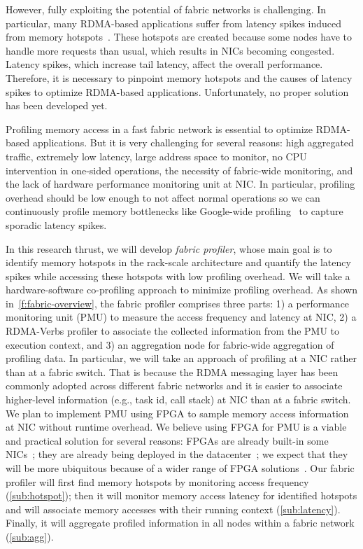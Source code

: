 However, fully exploiting the potential of fabric
networks is challenging. In particular, many RDMA-based applications
suffer from latency spikes induced from memory
hotspots~\cite{alek:farm, john:ramcloud, anuj:herd, stanko:rackout}.
These hotspots are created because some nodes have to handle more requests
than usual, which results in NICs becoming congested. Latency spikes, which
increase tail latency, affect the overall performance.
Therefore, it is necessary to pinpoint memory hotspots and the causes of
latency spikes to optimize RDMA-based applications. Unfortunately, no
proper solution has been developed yet.

\boxbeg
\begin{Challenge}
  Profiling memory access in a fast fabric network is essential to optimize
  RDMA-based applications. But it is very challenging
  for several reasons: high aggregated traffic, extremely low latency,
  large address space to monitor, no CPU intervention in one-sided
  operations, the necessity of fabric-wide monitoring, and the lack of
  hardware performance monitoring unit at NIC. In particular,
  profiling overhead should be low enough to not affect normal
  operations so we can continuously profile memory bottlenecks like
  Google-wide profiling~\cite{gwp:micro10} to capture sporadic latency
  spikes.
\end{Challenge}
\boxend

In this research thrust, we will develop {\em fabric profiler}, whose
main goal is to identify memory hotspots in the rack-scale
architecture and quantify the latency spikes while accessing these
hotspots with low profiling overhead.
We will take a hardware-software co-profiling approach to
minimize profiling overhead. As shown in~\autoref{f:fabric-overview},
the fabric profiler comprises three parts: 1) a performance monitoring
unit (PMU) to measure the access frequency and latency at NIC,
2) a RDMA-Verbs profiler to associate the collected information from
the PMU to execution context, and 3) an aggregation node for
fabric-wide aggregation of profiling data. In particular, we will take
an approach of profiling at a NIC rather than at a fabric switch.
That is because the RDMA messaging layer has been
commonly adopted across different fabric networks and it is easier to
associate higher-level information (e.g., task id, call stack) at NIC
than at a fabric switch. We plan to implement PMU using FPGA to sample
memory access information at NIC without runtime overhead. We believe
using FPGA for PMU is a viable and practical solution for several
reasons: FPGAs are already built-in some
NICs~\cite{mellanox:prodcut:web}; they are already being deployed in the
datacenter~\cite{andrew:catapult, bojie:clicknp, amazon:f1:web};
we expect that they will be more ubiquitous because of a wider range of
FPGA solutions~\cite{intel:fpga}. Our fabric profiler will first find
memory hotspots by monitoring access frequency
(\autoref{sub:hotspot}); then it will monitor memory access latency for
identified hotspots and will associate memory accesses with their running
context (\autoref{sub:latency}). Finally, it will aggregate profiled
information in all nodes within a fabric network (\autoref{sub:agg}).

